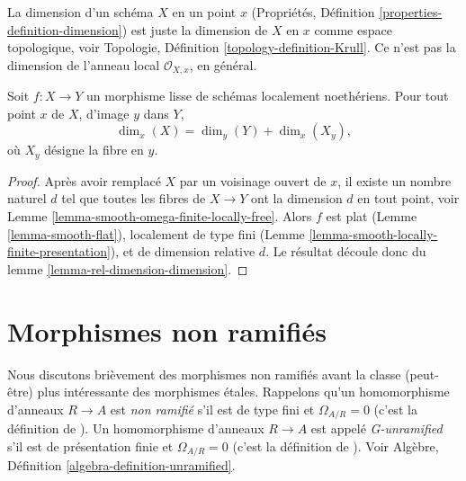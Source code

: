 \noindent
La dimension d'un schéma $X$ en un
point $x$ (Propriétés, Définition \ref{properties-definition-dimension}) est juste
la dimension de $X$ en $x$ comme espace
topologique, voir Topologie, Définition \ref{topology-definition-Krull}.
Ce n'est pas la dimension de l'anneau local $\mathcal{O}_{X,x}$, en général.

\begin{lemma}
\label{lemma-smoothness-dimension}
Soit $f : X \to Y$ un morphisme lisse de schémas localement noethériens. Pour tout point $x$
de $X$, d'image $y$ dans $Y$,
$$
\dim_x(X) = \dim_y(Y) + \dim_x(X_y),
$$
où $X_y$ désigne la fibre en $y$.
\end{lemma}

\begin{proof}
Après avoir remplacé $X$ par un voisinage
ouvert de $x$, il existe un nombre
naturel $d$ tel que toutes les fibres de
$X \to Y$ ont la dimension $d$ en tout
point, voir Lemme \ref{lemma-smooth-omega-finite-locally-free}. Alors $f$
est plat (Lemme \ref{lemma-smooth-flat}), localement de type fini (Lemme \ref{lemma-smooth-locally-finite-presentation}),
et de dimension relative $d$. Le résultat
découle donc du lemme \ref{lemma-rel-dimension-dimension}.
\end{proof}












\section{Morphismes non ramifiés}
\label{section-unramified}

\noindent
Nous discutons brièvement des morphismes non ramifiés avant la classe (peut-être) plus intéressante
des morphismes étales. Rappelons qu'un homomorphisme d'anneaux $R \to A$
est {\it non ramifié} s'il est de type fini et $\Omega_{A/R} = 0$
(c'est la définition de \cite{Henselian}). Un homomorphisme d'anneaux $R \to A$ est appelé
{\it G-unramified} s'il est de présentation finie et $\Omega_{A/R} = 0$
(c'est la
définition de \cite{EGA}). Voir Algèbre, Définition \ref{algebra-definition-unramified}.


